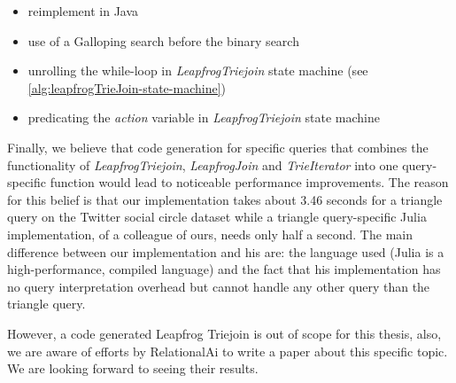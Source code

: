 \begin{itemize}
    \item reimplement in Java
    \item use of a Galloping search before the binary search
    \item unrolling the while-loop in \textit{LeapfrogTriejoin} state machine (see \cref{alg:leapfrogTrieJoin-state-machine})
    \item predicating the \textit{action} variable in \textit{LeapfrogTriejoin} state machine
\end{itemize}

Finally, we believe that code generation for specific queries that combines the functionality of \textit{LeapfrogTriejoin}, \textit{LeapfrogJoin}
and \textit{TrieIterator} into one query-specific function would lead to noticeable performance improvements.
The reason for this belief is that our implementation takes about 3.46 seconds for a triangle query on the Twitter social circle dataset
while a triangle query-specific Julia implementation, of a colleague of ours, needs only half a second.
The main difference between our implementation and his are: the language used (Julia is a high-performance, compiled language) and the fact
that his implementation has no query interpretation overhead but cannot handle any other query than the triangle query.

However, a code generated Leapfrog Triejoin is out of scope for this thesis, also, we are aware of efforts by RelationalAi to
write a paper about this specific topic.
We are looking forward to seeing their results.




